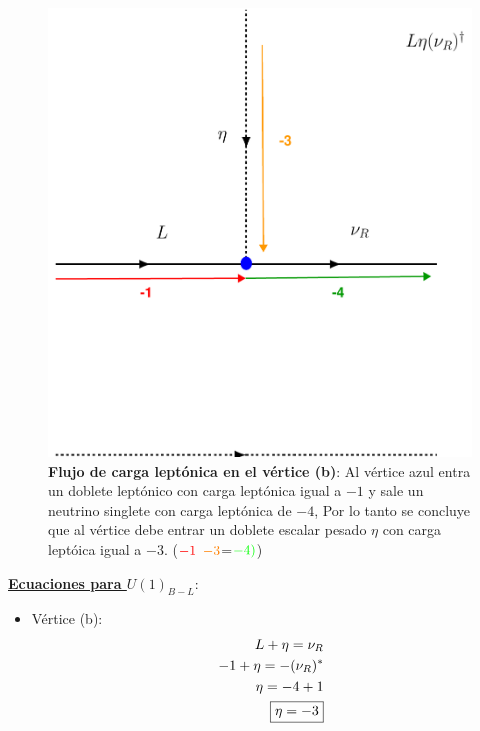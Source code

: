 \documentclass[12pt]{article}
\begin{document}
\begin{figure}[h!]
  \begin{center}
  \includegraphics[scale=0.5]{DiagramB-L.pdf}
\caption{{\textbf{Flujo de carga leptónica en el vértice (b)}: Al vértice azul entra un doblete leptónico con carga leptónica igual a $-1$ y sale un neutrino singlete con carga leptónica de $-4$, Por lo tanto se concluye que al vértice debe entrar un doblete escalar pesado $\eta$ con carga leptóica igual a $ -3$. ($\color{red}-1$ $\color{orange}-3$=$\color{green}-4)
$)}}
\label{fig:B-L}
\end{center}
\end{figure}


\underline{\textbf{Ecuaciones para $U(1)_{B-L}$}}:  
\begin{itemize}
    \item Vértice (b):
    \begin{equation}
    \label{eq:eqforB-L(a)}
    \begin{aligned}
            L+\eta=\nu_R \\
            -1 + \eta =-(\nu_R)^*  \\
            \eta=-4+1  \\
            \fbox{$ \eta=-3$}
    \end{aligned}
    \end{equation}
\end{itemize} 
\end{document}
